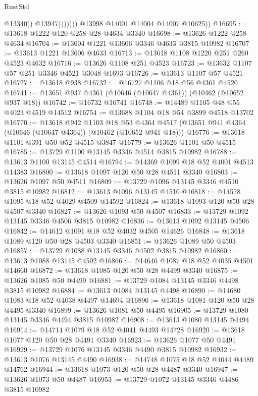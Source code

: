 \begin{lexlean}{RustStd}
\begin{coremodule}
                          @13340))
                      @13947)))))))
        @13998
        @14001
        @14004
        @14007
        @10625))
@16695 := @13618 @1222 @120 @258 @28 @4634 @3340
@16698 := @13626 @1222 @258 @4634
@16704 := @13604 @1221 @13606 @3346 @4633 @3815 @10982
@16707 := @13613 @1221 @13606 @4633
@16713 := @13618 @1108 @1220 @251 @260 @4523 @4632
@16716 := @13626 @1108 @251 @4523
@16723 := @13632 @1107 @57 @251 @3346 @4521 @3048 @1693
@16726 := @13613 @1107 @57 @4521
@16727 := @13618 @938
@16732 := @16727 @1106 @18 @56 @4361 @4520
@16741 := @13651 @937 @4361 (@10646 (@10647 @4361)) (@10462 (@10652 @937 @18))
@16742 := @16732 @16741
@16748 := @14489 @1105 @48 @55 @4023 @4519 @14512
@16754 := @13688 @1104 @18 @54 @3899 @4518 @13702
@16770 := @13618
    @942
    @1103
    @18
    @53
    @4364
    @4517
    (@13651 @941 @4364 (@10646 (@10647 @4364)) (@10462 (@10652 @941 @18)))
@16776 := @13618 @1101 @391 @50 @52 @4515 @3847
@16779 := @13626 @1101 @50 @4515
@16785 := @13729 @1100 @13145 @3346 @4514 @3815 @10982
@16788 := @13613 @1100 @13145 @4514
@16794 := @14369 @1099 @18 @52 @4001 @4513 @14383
@16800 := @13618 @1097 @120 @50 @28 @4511 @3340
@16803 := @13626 @1097 @50 @4511
@16809 := @13729 @1096 @13145 @3346 @4510 @3815 @10982
@16812 := @13613 @1096 @13145 @4510
@16818 := @14578 @1095 @18 @52 @4029 @4509 @14592
@16824 := @13618 @1093 @120 @50 @28 @4507 @3340
@16827 := @13626 @1093 @50 @4507
@16833 := @13729 @1092 @13145 @3346 @4506 @3815 @10982
@16836 := @13613 @1092 @13145 @4506
@16842 := @14612 @1091 @18 @52 @4032 @4505 @14626
@16848 := @13618 @1089 @120 @50 @28 @4503 @3340
@16851 := @13626 @1089 @50 @4503
@16857 := @13729 @1088 @13145 @3346 @4502 @3815 @10982
@16860 := @13613 @1088 @13145 @4502
@16866 := @14646 @1087 @18 @52 @4035 @4501 @14660
@16872 := @13618 @1085 @120 @50 @28 @4499 @3340
@16875 := @13626 @1085 @50 @4499
@16881 := @13729 @1084 @13145 @3346 @4498 @3815 @10982
@16884 := @13613 @1084 @13145 @4498
@16890 := @14680 @1083 @18 @52 @4038 @4497 @14694
@16896 := @13618 @1081 @120 @50 @28 @4495 @3340
@16899 := @13626 @1081 @50 @4495
@16905 := @13729 @1080 @13145 @3346 @4494 @3815 @10982
@16908 := @13613 @1080 @13145 @4494
@16914 := @14714 @1079 @18 @52 @4041 @4493 @14728
@16920 := @13618 @1077 @120 @50 @28 @4491 @3340
@16923 := @13626 @1077 @50 @4491
@16929 := @13729 @1076 @13145 @3346 @4490 @3815 @10982
@16932 := @13613 @1076 @13145 @4490
@16938 := @14748 @1075 @18 @52 @4044 @4489 @14762
@16944 := @13618 @1073 @120 @50 @28 @4487 @3340
@16947 := @13626 @1073 @50 @4487
@16953 := @13729 @1072 @13145 @3346 @4486 @3815 @10982

\end{coremodule}
\end{lexlean}
